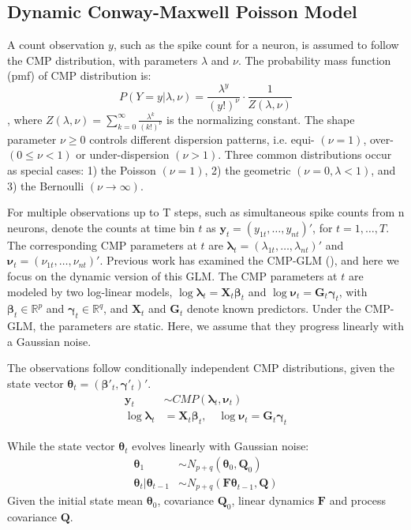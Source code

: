 \documentclass[]{article}
\begin{document}
	\subsection{Dynamic Conway-Maxwell Poisson Model}
	A count observation $y$, such as the spike count for a neuron, is assumed to follow the CMP distribution, with parameters $\lambda$ and $\nu$. The probability mass function (pmf) of CMP distribution is:
	\begin{equation}
		P(Y=y|\lambda, \nu) = \frac{\lambda^y}{(y!)^\nu}\cdot\frac{1}{Z(\lambda, \nu)}
	\end{equation}
	, where $Z(\lambda, \nu)=\sum_{k=0}^{\infty}\frac{\lambda^k}{(k!)^\nu}$ is the normalizing constant. The shape parameter $\nu \geq 0$ controls different dispersion patterns, i.e. equi- $(\nu=1)$, over- $(0\leq\nu<1)$ or under-dispersion $(\nu > 1)$. Three common distributions occur as special cases: 1) the Poisson $(\nu=1)$, 2) the geometric $(\nu=0, \lambda<1)$, and 3) the Bernoulli $(\nu \rightarrow \infty)$.
	
	For multiple observations up to T steps, such as simultaneous spike counts from n neurons, denote the counts at time bin $t$ as $\bm{y}_t = (y_{1t},\ldots,y_{nt})'$, for $t=1,\ldots, T$. The corresponding CMP parameters at $t$ are $\bm{\lambda}_t = (\lambda_{1t},\ldots,\lambda_{nt})'$ and $\bm{\nu}_t = (\nu_{1t},\ldots,\nu_{nt})'$. Previous work has examined the CMP-GLM (\cite{Chatla2018,Sellers2010}), and here we focus on the dynamic version of this GLM. The CMP parameters at $t$ are modeled by two log-linear models, $\log\bm{\lambda}_t = \bm{X}_t\bm{\beta}_t$ and $\log\bm{\nu}_t = \bm{G}_t\bm{\gamma}_t$, with $\bm{\beta}_t \in \mathbb{R}^p$ and $\bm{\gamma}_t \in \mathbb{R}^q$, and $\bm{X}_t$ and $\bm{G}_t$ denote known predictors. Under the CMP-GLM, the parameters are static. Here, we assume that they  progress linearly with a Gaussian noise.
	
	The observations follow conditionally independent CMP distributions, given the state vector $\bm{\theta}_t = (\bm{\beta}'_t, \bm{\gamma}'_t)'$. 
	\begin{align}
		\bm{y}_t &\sim CMP(\bm{\lambda}_t, \bm{\nu}_t)\\
		\log\bm{\lambda}_t &= \bm{X}_t\bm{\beta}_t, \quad \log\bm{\nu}_t = \bm{G}_t\bm{\gamma}_t \nonumber
	\end{align}
	
	While the state vector  $\bm{\theta}_t$ evolves linearly with Gaussian noise:
	\begin{align}
		\bm{\theta}_1 &\sim N_{p+q}(\bm{\theta}_0, \bm{Q}_0)\\
		\bm{\theta}_t|\bm{\theta}_{t-1} &\sim N_{p+q}(\bm{F\theta}_{t-1}, \bm{Q}) \nonumber
	\end{align}
	Given the initial state mean $\bm{\theta}_0$, covariance $\bm{Q}_0$, linear dynamics $\bm{F}$ and process covariance $\bm{Q}$.
	
\end{document}
